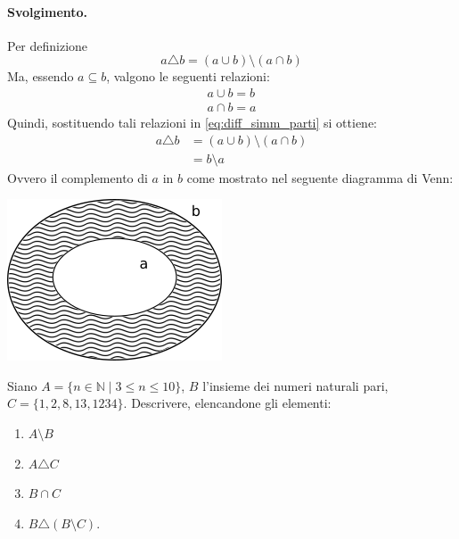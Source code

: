 \paragraph{Svolgimento.} Per definizione
\begin{equation}\label{eq:diff_simm_parti}
	a \triangle b = (a \cup b) \setminus (a \cap b)
\end{equation}
Ma, essendo $a \subseteq b$, valgono le seguenti relazioni:
\begin{eqnarray}
	a \cup b = b \\
	a \cap b = a
\end{eqnarray}
Quindi, sostituendo tali relazioni in \ref{eq:diff_simm_parti} si ottiene:
\begin{align*}
	a \triangle b &= (a \cup b) \setminus (a \cap b) \\
	&= b \setminus a
\end{align*}
Ovvero il complemento di $a$ in $b$ come mostrato nel seguente diagramma di Venn:
\begin{center}
	\includegraphics[scale=.8]{res/Venn_Esercizio10}
\end{center}
\hfill \blacksquare
\begin{exsbox}
	Siano $A=\{n \in \mathbb{N} \; | \; 3 \leq n \leq 10\}$, $B$ l'insieme dei numeri naturali pari, $C=\{1,2,8,13,1234\}$. Descrivere, elencandone gli elementi:
	\begin{enumerate}
		\item $A\setminus B$
		\item $A \triangle C$
		\item $B \cap C$
		\item $B \triangle (B \setminus C)$.
	\end{enumerate}
\end{exsbox}
